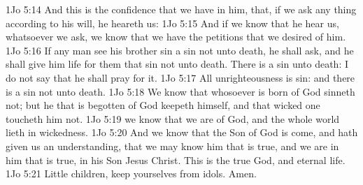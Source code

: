 \vs 1Jo 5:14 And this is the confidence that we have in him, that, if we ask any thing according to his will, he heareth us:
\vs 1Jo 5:15 And if we know that he hear us, whatsoever we ask, we know that we have the petitions that we desired of him.
\vs 1Jo 5:16 If any man see his brother sin a sin  not unto death, he shall ask, and he shall give him life for them that sin not unto death. There is a sin unto death: I do not say that he shall pray for it.
\vs 1Jo 5:17 All unrighteousness is sin: and there is a sin not unto death.
\vs 1Jo 5:18 We know that whosoever is born of God sinneth not; but he that is begotten of God keepeth himself, and that wicked one toucheth him not.
\vs 1Jo 5:19  we know that we are of God, and the whole world lieth in wickedness.
\vs 1Jo 5:20 And we know that the Son of God is come, and hath given us an understanding, that we may know him that is true, and we are in him that is true,  in his Son Jesus Christ. This is the true God, and eternal life.
\vs 1Jo 5:21 Little children, keep yourselves from idols. Amen.
